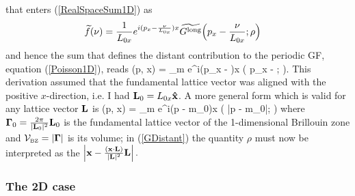 \documentclass[letterpaper]{article}
\newcommand{\wt}{\widetilde}
\newcommand{\vbGamma}{\boldsymbol{\Gamma}}
\begin{document}
that enters (\ref{RealSpaceSum1D}) as
\begin{align*}
   \wt f(\nu) 
 &= \frac{1}{L_{0x}} e^{i(p_x-\frac{\nu}{L_{0x}}) x}
                   \wt{G\sups{long}}\Big(p_x-\frac{\nu}{L_{0x}}; \rho\Big)
\end{align*}
and hence the sum that defines the distant contribution
to the periodic GF, equation (\ref{Poisson1D}), reads
{
  (\vb p, \vb x) 
  = \sum_{m} e^{i(p_x - )x}
   \wt{G\sups{long}}\Big( p_x - ; \rho\Big).
}
This derivation assumed that the fundamental lattice vector was aligned 
with the positive $x$-direction, i.e. I had $\mathbf{L}_0=L_{0x}\mathbf{\hat x}$.
A more general form which is valid for any lattice vector $\mathbf{L}$
is 
{
  (\vb p, \vb x)
  =
   \sum_{m} e^{i(\vb p - m\vbGamma_0)\cdot \vb x}
          \wt{G\sups{long}}\Big( \big|\vb p - m\vbGamma_0\big|; \rho\Big)
}
where $\vbGamma_0=\frac{2\pi}{|\vb L_0|^2}\vb L_0$ 
is the fundamental lattice vector of the 1-dimensional
Brillouin zone and 
$\mc V\subt{BZ}=|\vbGamma|$ is its volume; in (\ref{GDistant}) 
the quantity $\rho$ must now be interpreted as the 
$\left| \mathbf{x} - \frac{(\mathbf{x} \cdot \mathbf{L})}{|\mathbf{L}|^2}\mathbf{L}\right|.$

\subsubsection{The 2D case}
\end{document}

